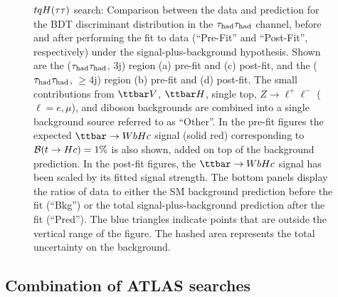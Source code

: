 \begin{figure}[htbp]
\begin{center}
\caption{\small{$tqH(\tau\tau)$ search: Comparison between the data and prediction for the BDT discriminant distribution in the 
$\tau_{\mathrm{had}} \tau_{\mathrm{had}}$ channel, before and after performing the fit to data  (``Pre-Fit'' and ``Post-Fit'', respectively) under the signal-plus-background hypothesis.
Shown are the ($\tau_{\mathrm{had}} \tau_{\mathrm{had}}$, 3j) region (a) pre-fit and (c) post-fit, and the ($\tau_{\mathrm{had}} \tau_{\mathrm{had}}$, $\geq$4j) region (b) pre-fit and (d) post-fit.
The small contributions from $\ttbar V$, $\ttbar H$, single top, $Z\to \ell^+\ell^-$ ($\ell = e, \mu$), and diboson backgrounds are combined 
into a single background source referred to as ``Other''. 
In the pre-fit figures the expected $\Hc$ signal (solid red) corresponding to $\mathcal{B}(t\to Hc)=1\%$ is also shown,
added on top of the background prediction. In the post-fit figures, the $\Hc$ signal has been scaled by its fitted signal strength.
The bottom panels display the ratios of data to either the SM background prediction before the fit (``Bkg'')  or the total signal-plus-background
prediction after the fit (``Pred''). 
The blue triangles indicate points that are outside the vertical range of the figure. 
The hashed area represents the total uncertainty on the background. }}
\label{fig:prepostfit_unblinded_WbHc_hh}
\end{center}
\end{figure}

\subsection{Combination of ATLAS searches}
\label{sec:results_combo}

